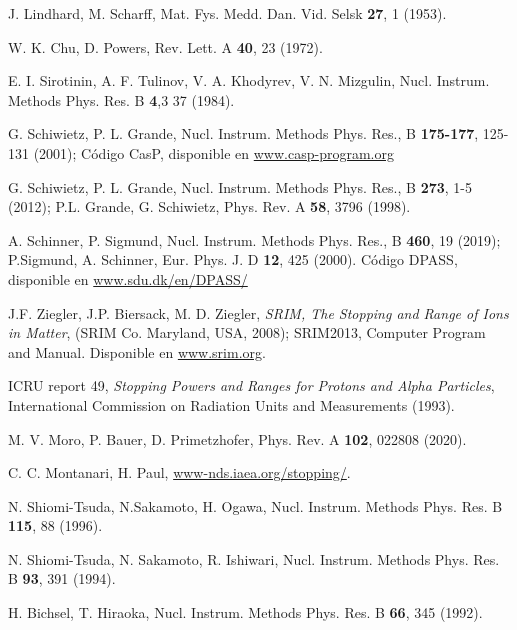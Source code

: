 \begin{thebibliography}{9}
J. Lindhard, M. Scharff,  
Mat. Fys. Medd. Dan. Vid. Selsk  \textbf{27}, 1 (1953).

W. K. Chu, D. Powers, 
Rev. Lett. A \textbf{40}, 23 (1972).

E. I. Sirotinin, A. F. Tulinov, V. A. Khodyrev, V. N. Mizgulin, 
Nucl. Instrum. Methods Phys. Res. B \textbf{4},3 37 (1984).

G. Schiwietz, P. L. Grande, 
Nucl. Instrum. Methods Phys. Res., B \textbf{175-177}, 125-131 (2001); 
Código CasP, disponible en \href{https://www.casp-program.org}
{www.casp-program.org}

G. Schiwietz, P. L. Grande,
Nucl. Instrum. Methods Phys. Res., B \textbf{273}, 1-5 (2012); 
P.L. Grande, G. Schiwietz, 
Phys. Rev. A \textbf{58}, 3796 (1998).

A. Schinner, P. Sigmund, 
Nucl. Instrum. Methods Phys. Res., B \textbf{460}, 19 (2019); 
P.Sigmund, A. Schinner, 
Eur. Phys. J. D \textbf{12}, 425 (2000). 
Código DPASS, disponible en \href{https://www.sdu.dk/en/DPASS/}
{www.sdu.dk/en/DPASS/}

J.F. Ziegler, J.P. Biersack, M. D. Ziegler, 
\textit{SRIM, The Stopping and Range of Ions in Matter}, 
(SRIM Co. Maryland, USA, 2008); 
SRIM2013, Computer Program and Manual. Disponible en 
\href{https://www.srim.org}{www.srim.org}.

ICRU report 49, \textit{Stopping Powers and Ranges for Protons and 
Alpha Particles},
International Commission on Radiation Units and Measurements (1993).

M. V. Moro, P. Bauer, D. Primetzhofer,
Phys. Rev. A \textbf{102}, 022808 (2020).

C. C. Montanari, H. Paul,
\href{https://www-nds.iaea.org/stopping/}{www-nds.iaea.org/stopping/}.

N. Shiomi-Tsuda, N.Sakamoto, H. Ogawa, 
Nucl. Instrum. Methods Phys. Res. B \textbf{115}, 88 (1996).

N. Shiomi-Tsuda, N. Sakamoto, R. Ishiwari, 
Nucl. Instrum. Methods Phys. Res. B \textbf{93}, 391 (1994).

H. Bichsel, T. Hiraoka, 
Nucl. Instrum. Methods Phys. Res. B \textbf{66}, 345 (1992).


\end{thebibliography}
